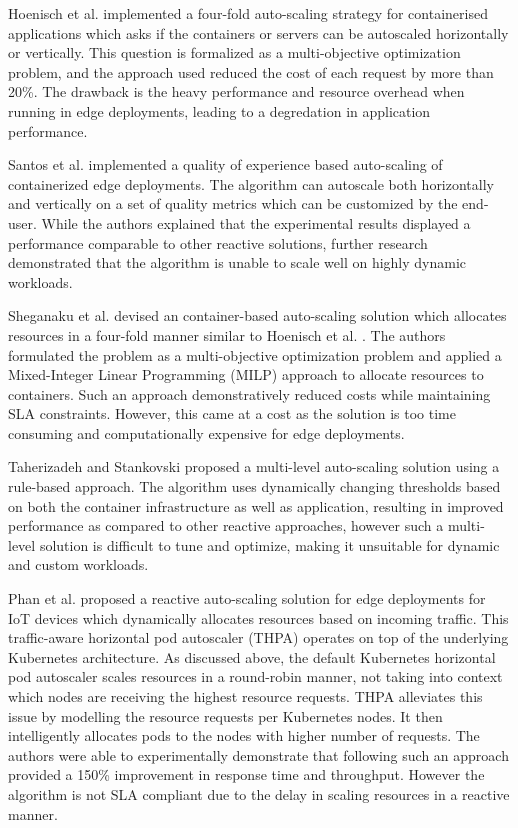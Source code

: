 Hoenisch et al. \cite{hoenisch2015four} implemented a four-fold auto-scaling strategy for containerised applications which asks if the containers or servers can be autoscaled horizontally or vertically. This question is formalized as a multi-objective optimization problem, and the approach used reduced the cost of each request by more than 20\%. The drawback is the heavy performance and resource overhead when running in edge deployments, leading to a degredation in application performance.\par

Santos et al. \cite{santos2020qoe} implemented a quality of experience based auto-scaling of containerized edge deployments. The algorithm can autoscale both horizontally and vertically on a set of quality metrics which can be customized by the end-user. While the authors explained that the experimental results displayed a performance comparable to other reactive solutions, further research demonstrated that the algorithm is unable to scale well on highly dynamic workloads.\par

Sheganaku et al. \cite{sheganaku2023cost} devised an container-based auto-scaling solution which allocates resources in a four-fold manner similar to Hoenisch et al. \cite{hoenisch2015four}. The authors formulated the problem as a multi-objective optimization problem and applied a Mixed-Integer Linear Programming (MILP) approach to allocate resources to containers. Such an approach demonstratively reduced costs while maintaining SLA constraints. However, this came at a cost as the solution is too time consuming and computationally expensive for edge deployments.\par

Taherizadeh and Stankovski \cite{taherizadeh2019dynamic} proposed a multi-level auto-scaling solution using a rule-based approach. The algorithm uses dynamically changing thresholds based on both the container infrastructure as well as application, resulting in improved performance as compared to other reactive approaches, however such a multi-level solution is difficult to tune and optimize, making it unsuitable for dynamic and custom workloads.\par

Phan et al. \cite{phan2022traffic} proposed a reactive auto-scaling solution for edge deployments for IoT devices which dynamically allocates resources based on incoming traffic. This traffic-aware horizontal pod autoscaler (THPA) operates on top of the underlying Kubernetes architecture. As discussed above, the default Kubernetes horizontal pod autoscaler scales resources in a round-robin manner, not taking into context which nodes are receiving the highest resource requests. THPA alleviates this issue by modelling the resource requests per Kubernetes nodes. It then intelligently allocates pods to the nodes with higher number of requests. The authors were able to experimentally demonstrate that following such an approach provided a 150\% improvement in response time and throughput. However the algorithm is not SLA compliant due to the delay in scaling resources in a reactive manner.

